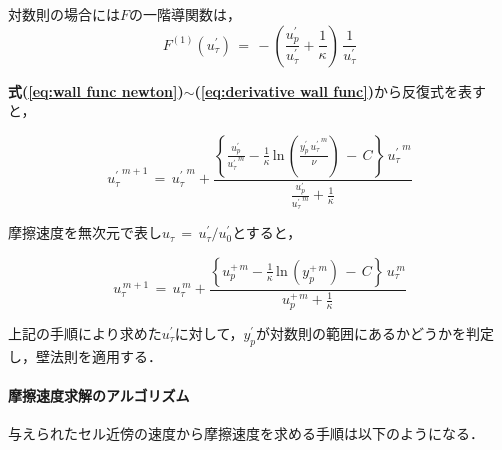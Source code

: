 \noindent 対数則の場合には$F$の一階導関数は，
\begin{equation}
F^{(1)} \left( {u_{\tau}^{\prime}} \right) \,=\,
- \left( {\frac{u_p^{\prime}}{u_{\tau}^{\prime}} + \frac{1}{\kappa}} \right) \, \frac{1}{u_{\tau}^{\prime}}
\label{eq:derivative wall func}
\end{equation}

\noindent \textbf{式(\ref{eq:wall func newton})}$\sim$\textbf{(\ref{eq:derivative wall func})}から反復式を表すと，

\begin{equation} 
{u_{\tau}^{\prime}}^{\,m+1} \,=\, {u_{\tau}^{\prime}}^{\,m} + 
\frac{ 
\displaystyle{
\left\{
\frac{u_p^{\prime}}{{u_{\tau}^{\prime}}^{\,m}}
 - \frac{1}{\kappa} \, 
 \mathrm{ln}\,\left( \frac{y_p^{\prime} \, {u_{\tau}^{\prime}}^{\,m}} {\nu} \right) 
 \,-\, C \right\} \, 
 {u_{\tau}^{\prime}}^{\,m} }
}
{ \displaystyle{ \frac{u_p^{\prime}}{{u_{\tau}^{\prime}}^{\,m}} + \frac{1}{\kappa} }
}
\label{eq:newton iteration wall func}
\end{equation}


摩擦速度を無次元で表し$u_{\tau}\,=\,u_{\tau}^{\prime}/u_0^{\prime}$とすると，

\begin{equation} 
u_{\tau}^{\,m+1}
\, = \,
u_{\tau}^{\,m} + 
\frac{ 
\displaystyle{
\left\{ 
u_p^{+\,m} - \frac{1}{\kappa} \, 
 \mathrm{ln}\,\left( y_p^{+\,m} \right) \,-\, C \right\} \, u_{\tau}^{\,m} }
}
{ \displaystyle{ u_p^{+\,m} + \frac{1}{\kappa} }
}
\label{eq:newton iteration wall func ND}
\end{equation}

上記の手順により求めた$u_{\tau}^{\prime}$に対して，$y_p^{\prime}$が対数則の範囲にあるかどうかを判定し，壁法則を適用する．

%
\vspace{5mm}
\paragraph{摩擦速度求解のアルゴリズム}
与えられたセル近傍の速度から摩擦速度を求める手順は以下のようになる．

